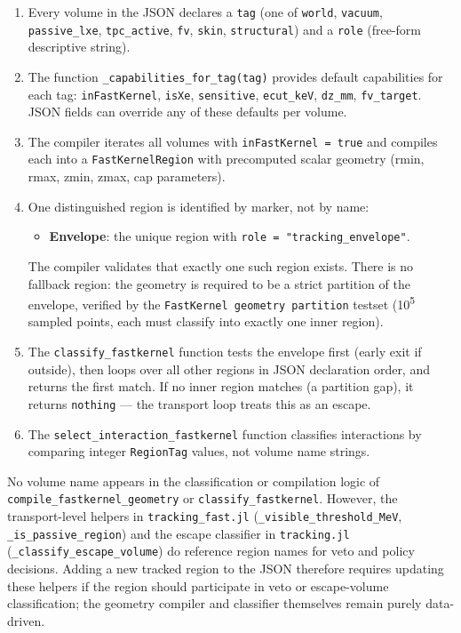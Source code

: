 \documentclass[11pt]{article}
\begin{document}
\begin{enumerate}[label=\arabic*.]
\item Every volume in the JSON declares a \texttt{tag} (one of \texttt{world},
\texttt{vacuum}, \texttt{passive\_lxe}, \texttt{tpc\_active}, \texttt{fv},
\texttt{skin}, \texttt{structural}) and a \texttt{role} (free-form descriptive
string).

\item The function \texttt{\_capabilities\_for\_tag(tag)} provides default
capabilities for each tag: \texttt{inFastKernel}, \texttt{isXe},
\texttt{sensitive}, \texttt{ecut\_keV}, \texttt{dz\_mm}, \texttt{fv\_target}.
JSON fields can override any of these defaults per volume.

\item The compiler iterates all volumes with \texttt{inFastKernel = true} and
compiles each into a \texttt{FastKernelRegion} with precomputed scalar geometry
(rmin, rmax, zmin, zmax, cap parameters).

\item One distinguished region is identified by marker, not by name:
\begin{itemize}
\item \textbf{Envelope}: the unique region with \texttt{role = "tracking\_envelope"}.
\end{itemize}
The compiler validates that exactly one such region exists. There is no
fallback region: the geometry is required to be a strict partition of
the envelope, verified by the \texttt{FastKernel geometry partition}
testset (10\textsuperscript{5} sampled points, each must classify into
exactly one inner region).

\item The \texttt{classify\_fastkernel} function tests the envelope first
(early exit if outside), then loops over all other regions in JSON declaration
order, and returns the first match. If no inner region matches (a partition
gap), it returns \texttt{nothing} --- the transport loop treats this as an
escape.

\item The \texttt{select\_interaction\_fastkernel} function classifies
interactions by comparing integer \texttt{RegionTag} values, not volume name
strings.
\end{enumerate}

No volume name appears in the classification or compilation logic of
\texttt{compile\_fastkernel\_geometry} or \texttt{classify\_fastkernel}.
However, the transport-level helpers in \texttt{tracking\_fast.jl}
(\texttt{\_visible\_threshold\_MeV}, \texttt{\_is\_passive\_region}) and the
escape classifier in \texttt{tracking.jl}
(\texttt{\_classify\_escape\_volume}) do reference region names for veto
and policy decisions. Adding a new tracked region to the JSON therefore
requires updating these helpers if the region should participate in veto
or escape-volume classification; the geometry compiler and classifier
themselves remain purely data-driven.
\end{document}
